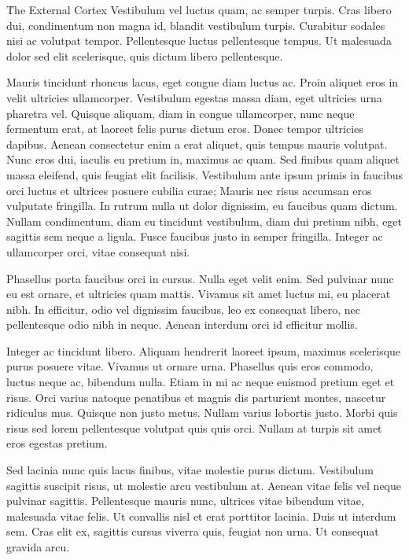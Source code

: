 \documentclass[onecolumn]{tome}
\begin{document}
\h{The External Cortex}
Vestibulum vel luctus quam, ac semper turpis. Cras libero dui, condimentum non magna id, blandit vestibulum turpis. Curabitur sodales nisi ac volutpat tempor. Pellentesque luctus pellentesque tempus. Ut malesuada dolor sed elit scelerisque, quis dictum libero pellentesque.

Mauris tincidunt rhoncus lacus, eget congue diam luctus ac. Proin aliquet eros in velit ultricies ullamcorper. Vestibulum egestas massa diam, eget ultricies urna pharetra vel. Quisque aliquam, diam in congue ullamcorper, nunc neque fermentum erat, at laoreet felis purus dictum eros. Donec tempor ultricies dapibus. Aenean consectetur enim a erat aliquet, quis tempus mauris volutpat. Nunc eros dui, iaculis eu pretium in, maximus ac quam. Sed finibus quam aliquet massa eleifend, quis feugiat elit facilisis. Vestibulum ante ipsum primis in faucibus orci luctus et ultrices posuere cubilia curae; Mauris nec risus accumsan eros vulputate fringilla. In rutrum nulla ut dolor dignissim, eu faucibus quam dictum. Nullam condimentum, diam eu tincidunt vestibulum, diam dui pretium nibh, eget sagittis sem neque a ligula. Fusce faucibus justo in semper fringilla. Integer ac ullamcorper orci, vitae consequat nisi.

Phasellus porta faucibus orci in cursus. Nulla eget velit enim. Sed pulvinar nunc eu est ornare, et ultricies quam mattis. Vivamus sit amet luctus mi, eu placerat nibh. In efficitur, odio vel dignissim faucibus, leo ex consequat libero, nec pellentesque odio nibh in neque. Aenean interdum orci id efficitur mollis.

Integer ac tincidunt libero. Aliquam hendrerit laoreet ipsum, maximus scelerisque purus posuere vitae. Vivamus ut ornare urna. Phasellus quis eros commodo, luctus neque ac, bibendum nulla. Etiam in mi ac neque euismod pretium eget et risus. Orci varius natoque penatibus et magnis dis parturient montes, nascetur ridiculus mus. Quisque non justo metus. Nullam varius lobortis justo. Morbi quis risus sed lorem pellentesque volutpat quis quis orci. Nullam at turpis sit amet eros egestas pretium.

Sed lacinia nunc quis lacus finibus, vitae molestie purus dictum. Vestibulum sagittis suscipit risus, ut molestie arcu vestibulum at. Aenean vitae felis vel neque pulvinar sagittis. Pellentesque mauris nunc, ultrices vitae bibendum vitae, malesuada vitae felis. Ut convallis nisl et erat porttitor lacinia. Duis ut interdum sem. Cras elit ex, sagittis cursus viverra quis, feugiat non urna. Ut consequat gravida arcu.
\end{document}
